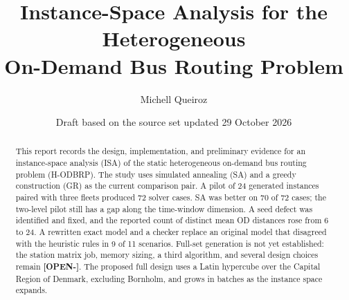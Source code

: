 \documentclass[11pt,a4paper]{article}
\title{Instance-Space Analysis for the Heterogeneous\\On-Demand Bus Routing Problem}
\author{Michell Queiroz}
\date{Draft based on the source set updated 29 October 2026}
\newcommand{\tagopen}[1][]{\textbf{[OPEN\ifx\relax#1\relax\else-#1\fi]}}
\begin{document}
\maketitle

\begin{abstract}
This report records the design, implementation, and preliminary evidence for an
instance-space analysis (ISA) of the static heterogeneous on-demand bus routing
problem (H-ODBRP). The study uses simulated annealing (SA) and a greedy
construction (GR) as the current comparison pair. A pilot of 24 generated
instances paired with three fleets produced 72 solver cases. SA was better on
70 of 72 cases; the two-level pilot still has a gap along the time-window
dimension. A seed defect was identified and fixed, and the reported count of
distinct mean OD distances rose from 6 to 24. A rewritten exact model and a
checker replace an original model that disagreed with the heuristic rules in
9 of 11 scenarios. Full-set generation is not yet established: the station
matrix job, memory sizing, a third algorithm, and several design choices remain
\tagopen. The proposed full design uses a Latin hypercube over the Capital
Region of Denmark, excluding Bornholm, and grows in batches as the instance
space expands.
\end{abstract}












\end{document}
